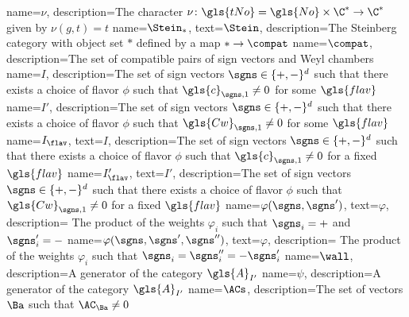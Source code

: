   {
       name={\ensuremath{\nu}},
   description={The character $\nu\colon  \gls{tNo}=\gls{No}\times \C^* \to
\C^*$ given by $\nu(g,t)=t$}
}
  {
   name={\ensuremath{\Stein_*}},
   text={\ensuremath{\Stein}},
   description={The Steinberg category with object set $*$ defined by
     a map $*\to \compat$}
 }
  {
   name={\ensuremath{\compat}},
   description={The set of compatible pairs of sign vectors and Weyl chambers}
 }
   {
       name={\ensuremath{I}},
   description={The set of sign vectors $\sgns\in \{+,-\}^d$ such that
  there exists a choice of flavor $\phi$ such that
  $\gls{c}_{\sgns,1}\neq 0$ for some $\gls{flav}$}
 }
  {
       name={\ensuremath{I'}},
   description={The set of sign vectors $\sgns\in \{+,-\}^d$ such that
  there exists a choice of flavor $\phi$ such that
  $\gls{Cw}_{\sgns,1}\neq 0$ for some $\gls{flav}$}
 }
  {
       name={\ensuremath{I_{\flav}}},
     text={\ensuremath{I}},
   description={The set of sign vectors $\sgns\in \{+,-\}^d$ such that
  there exists a choice of flavor $\phi$ such that
  $\gls{c}_{\sgns,1}\neq 0$ for a fixed $\gls{flav}$}
 }
  {
      name={\ensuremath{I_{\flav}'}},
     text={\ensuremath{I'}},
 description={The set of sign vectors $\sgns\in \{+,-\}^d$ such that
  there exists a choice of flavor $\phi$ such that
  $\gls{Cw}_{\sgns,1}\neq 0$ for a fixed $\gls{flav}$}
}
  {
      name={\ensuremath {\varphi(\sgns,\sgns' )}},
     text={\ensuremath{\varphi}},
 description={ The product of the weights $\varphi_i$ such that $\sgns_i=+$ and
  $\sgns_i'=-$}
}
  {
      name={\ensuremath {\varphi(\sgns,\sgns',\sgns'')}},
     text={\ensuremath{\varphi}},
 description={ The product of the weights
  $\varphi_i$ such that $\sgns_i=\sgns_i''=-\sgns_i'$}
}
    {
       name={\ensuremath{\wall}},
   description={A generator of the category $\gls{A}_{I'}$}
 }
  {
       name={\ensuremath{\psi}},
       description={A generator of the category $\gls{A}_{I'}$}
 }
   {
       name={\ensuremath{\ACs}},
       description={The set of vectors $\Ba$ such that $\AC_{\Ba}\neq 0$}
     }
     
